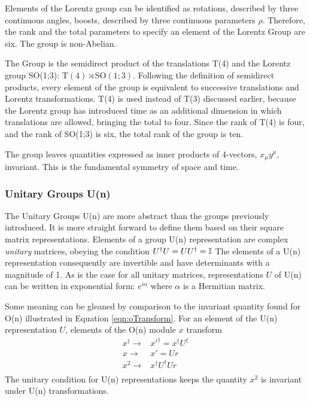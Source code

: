 Elements of the Lorentz group can be identified as rotations, described by three continuous angles, boosts, described by three continuous parameters $\rho$.
Therefore, the rank and the total parameters to specify an element of the Lorentz Group are six.
The group is non-Abelian.

The \poincare Group is the semidirect product of the translations T(4) and the Lorentz group SO(1;3): $\text{T}(4)\rtimes\text{SO}(1;3)$.
Following the definition of semidirect products, every element of the \poincare group is equivalent to successive translations and Lorentz transformations.
T(4) is used instead of T(3) discussed earlier, because the Lorentz group has introduced time as an additional dimension in which translations are allowed, bringing the total to four.
Since the rank of T(4) is four, and the rank of SO(1;3) is six, the total rank of the \poincare group is ten.


The \poincare group leaves quantities expressed as inner products of 4-vectors, $x_\mu y^\mu$, invariant.
This is the fundamental symmetry of space and time. 

\subsubsection{Unitary Groups U(n)}\label{sec:unitary}

The Unitary Groups U(n) are more abstract than the groups previously introduced.
It is more straight forward to define them based on their \nxn square matrix representations.
Elements of a group U(n) representation are complex \emph{unitary} matrices, obeying the condition $U^\dagger U=UU^\dagger=\mathbb{I}$
The elements of a U(n) representation consequently are invertible and have determinants with a magnitude of 1.
As is the case for all unitary matrices, representations $U$ of U(n) can be written in exponential form: $e^{i\alpha}$ where $\alpha$ is a Hermitian matrix.

Some meaning can be gleaned by comparison to the invariant quantity found for O(n) illustrated in Equation \ref{eqn:oTransform}.
For an element of the U(n) representation $U$, elements of the O(n) module $x$ transform 
\begin{equation}\begin{split}\label{eqn:uTransform}
    x^\dagger\to&x'^\dagger=x^\dagger U^\dagger \\
    x\to&x'=Ur \\
    x^2\to&x^\dagger U^\dagger Ur \\
\end{split}\end{equation}
The unitary condition for U(n) representations keeps the quantity $x^2$ is invariant under U(n) transformations.

